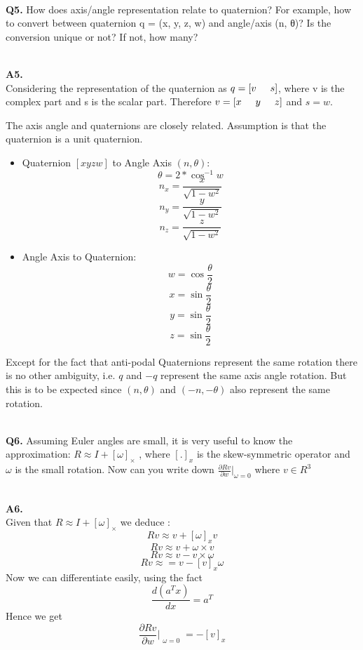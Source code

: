 \documentclass{article}
\newcommand\Problem[1]{
  \\
  \textbf{Q#1.}
}
\newcommand\Sol[1]{
  \\
  \textbf{A#1.}
  \\
}
\newcommand\tab[1][0.5cm]{\hspace*{#1}}
\begin{document}
\Problem{5} How does axis/angle representation relate to quaternion? For example, how to
convert between quaternion q = (x, y, z, w) and angle/axis (n, θ)? Is the conversion
unique or not? If not, how many?
\Sol{5}
Considering the representation of the quaternion as $q = [v \tab s]$, where v is the complex part
and s is the scalar part. Therefore $v = [x \tab y \tab z]$ and $s = w$.

The axis angle and quaternions are closely related. Assumption is that the quaternion is a unit quaternion.
\begin{itemize}
\item Quaternion $[x y z w]$ to Angle Axis $(n,\theta)$:
  $$\theta = 2 * \cos^{-1} w$$
  $$n_x = \frac{x}{\sqrt{1 - w^2}}$$
  $$n_y = \frac{y}{\sqrt{1 - w^2}}$$
  $$n_z = \frac{z}{\sqrt{1 - w^2}}$$
\item Angle Axis to Quaternion:
  $$w = \cos \frac{\theta}{2}$$
  $$x = \sin \frac{\theta}{2}$$
  $$y = \sin \frac{\theta}{2}$$
  $$z = \sin \frac{\theta}{2}$$
\end{itemize}

Except for the fact that anti-podal Quaternions represent the same rotation there is no other ambiguity, i.e. $q$ and
$-q$ represent the same axis angle rotation. But this is to be expected since $(n,\theta)$ and $(-n,-\theta)$ also represent
the same rotation.

\Problem{6} Assuming Euler angles are small, it is very useful to know the approximation:
$R \approx I + [\omega]_×$ , where $[.]_x$ is the skew-symmetric operator and $\omega$ is the small rotation.
Now can you write down $\frac{\partial Rv}{\partial w}|_{\omega = 0}$ where $v \in R^3$
\Sol{6}
Given that $R \approx I + [\omega]_×$ we deduce : $$Rv \approx v + [\omega]_xv$$
$$Rv \approx v + \omega \times v$$
$$Rv \approx v - v \times \omega$$
$$Rv \approx = v - [v]_x\omega$$
Now we can differentiate easily, using the fact
$$\frac{d(a^Tx)}{dx} = a^T$$
Hence we get
$$\frac{\partial Rv}{\partial w}|_{\substack{\omega = 0}} = -[v]_x$$
\end{document}
